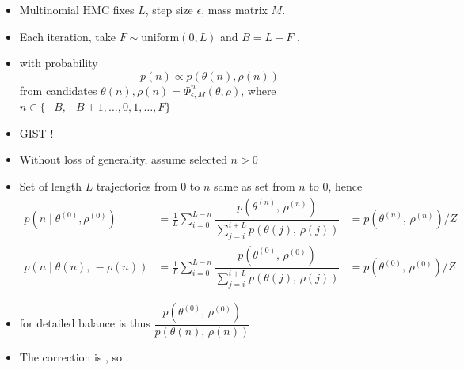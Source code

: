 \documentclass[10pt]{report}
\newcommand{\pos}[2]{#1^{(#2)}}
\begin{document}
\begin{itemize}
\item Multinomial HMC fixes  $L$, step size
  $\epsilon$, mass matrix $M$.
\item Each iteration, take $F \sim \textrm{uniform}(0, L)$  and $B = L - F$ .
  \item {} with probability
    $$p(n) \propto p(\theta(n), \rho(n))$$ from
    candidates  $\theta(n), \rho(n) = \Phi^n_{\epsilon,
      M}(\theta, \rho)$, where $n \in \{ -B, -B + 1, \ldots, 0, 1, \ldots, F \}$
\item GIST !
\end{itemize}

\begin{itemize}
\item Without loss of generality, assume selected $n > 0$
\item Set of length $L$ trajectories from 0 to $n$ same
  as set from $n$ to 0, hence
\begin{align*}
  p(n \mid \pos{\theta}{0}, \pos{\rho}{0})
  &= \frac{1}{L} \sum_{i=0}^{L-n}
      \dfrac{p(\pos{\theta}{n},\, \pos{\rho}{n})}
            {\sum_{j=i}^{i + L} p(\theta(j),\, \rho(j))}
  &= p(\pos{\theta}{n},\, \pos{\rho}{n}) / Z
  \\[4pt]
  p(n \mid \theta(n),\, -\rho(n))
  &= \frac{1}{L} \sum_{i=0}^{L-n} \dfrac{p(\pos{\theta}{0},\, \pos{\rho}{0})}
                           {\sum_{j=i}^{i + L} p(\theta(j),\, \rho(j))}
  & = p(\pos{\theta}{0},\, \pos{\rho}{0}) / Z
\end{align*}
\item {} for detailed balance is thus
$\dfrac{p(\pos{\theta}{0},\, \pos{\rho}{0})}
      {p(\theta(n),\, \rho(n))}$
\item The correction is , so .
\end{itemize}
\end{document}
